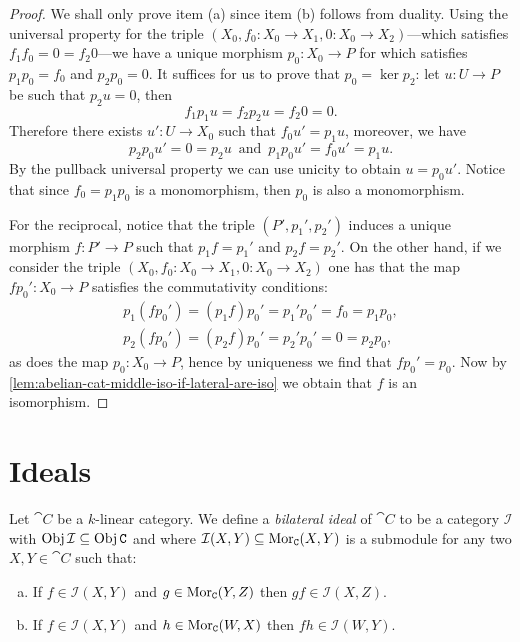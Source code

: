 \begin{proof}
We shall only prove item (a) since item (b) follows from duality. Using the
universal property for the triple
\((X_0, f_0: X_0 \to X_1, 0: X_0 \to X_2)\)---which satisfies
\(f_1 f_0 = 0 = f_2 0\)---we have a unique morphism \(p_0: X_0 \to P\) for which
satisfies \(p_1 p_0 = f_0\) and \(p_2 p_0 = 0\). It suffices for us to prove
that \(p_0 = \ker p_2\): let \(u: U \to P\) be such that \(p_2 u = 0\), then
\[
f_1 p_1 u = f_2 p_2 u  = f_2 0 = 0.
\]
Therefore there exists \(u': U \to X_0\) such that \(f_0 u' = p_1 u\), moreover,
we have
\[
p_2 p_0 u' = 0 = p_2 u\, \text{ and }\, p_1 p_0 u' = f_0 u' = p_1 u.
\]
By the pullback universal property we can use unicity to obtain \(u = p_0
u'\). Notice that since \(f_0 = p_1 p_0\) is a monomorphism, then \(p_0\) is
also a monomorphism.

For the reciprocal, notice that the triple \((P', p_1', p_2')\) induces a unique
morphism \(f: P' \to P\) such that \(p_1 f = p_1'\) and \(p_2 f = p_2'\). On the
other hand, if we consider the triple
\((X_0, f_0: X_0 \to X_1, 0: X_0 \to X_2)\) one has that the map
\(f p_0': X_0 \to P\) satisfies the commutativity conditions:
\begin{gather*}
  p_1 (f p_0') = (p_1 f) p_0' = p_1' p_0' = f_0 = p_1 p_0, \\
  p_2 (f p_0') = (p_2 f) p_0' = p_2' p_0' = 0 = p_2 p_0,
\end{gather*}
as does the map \(p_0: X_0 \to P\), hence by uniqueness we find that
\(f p_0' = p_0\). Now by \cref{lem:abelian-cat-middle-iso-if-lateral-are-iso} we
obtain that \(f\) is an isomorphism.
\end{proof}

\section{Ideals}

\begin{definition}
\label{def:k-linear-cat-bilateral-ideal}
Let \(\cat C\) be a \(k\)-linear category. We define a \emph{bilateral ideal} of
\(\cat C\) to be a category \(\mathcal{I}\) with
\(\operatorname{Obj} \mathcal{I} \subseteq \operatorname{Obj} \texttt C\) and where \(\mathcal{I}(X, Y) \subseteq \operatorname{Mor}_{\texttt C}(X, Y)\) is a
submodule for any two \(X, Y \in \cat C\) such that:
\begin{enumerate}[(a)]\setlength\itemsep{0em}
\item If \(f \in \mathcal{I}(X, Y)\) and \(g \in \operatorname{Mor}_{\texttt C}(Y, Z)\) then \(g f \in \mathcal{I}(X, Z)\).

\item If \(f \in \mathcal{I}(X, Y)\) and \(h \in \operatorname{Mor}_{\texttt C}(W, X)\) then \(f h \in \mathcal{I}(W, Y)\).
\end{enumerate}
\end{definition}


